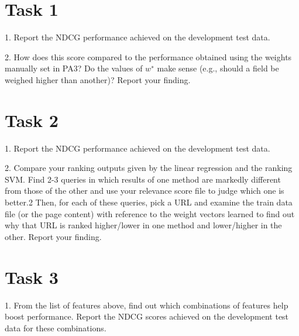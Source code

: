 
\usepackage{graphicx,amssymb,amsmath,enumerate}
\usepackage{courier}
\usepackage{color}
\usepackage{listings}
\usepackage{fancyvrb}
\usepackage{stmaryrd}

\oddsidemargin 0in
\evensidemargin 0in
\textwidth 6.5in
\topmargin -0.5in
\textheight 9.0in




\pagestyle{myheadings}  %

\section{Task 1}
1. Report the NDCG performance achieved on the development test data.

2. How does this score compared to the performance obtained using the weights manually set in PA3? Do the values of $w^∗$ make sense (e.g., should a field be weighed higher than another)? Report your finding.

\section{Task 2}
1. Report the
NDCG performance achieved on the development test data.


2. Compare your ranking outputs given by the linear regression and the ranking SVM.
Find 2-3 queries in which results of one method are markedly different from those
of the other and use your relevance score file to judge which one is better.2
Then, for each of these queries, pick a URL and examine the train data file (or the
page content) with reference to the weight vectors learned to find out why that
URL is ranked higher/lower in one method and lower/higher in the other. Report
your finding.



\section{Task 3}
1. From the list of features above, find out which combinations of features help boost
performance. Report the NDCG scores achieved on the development test data
for these combinations.

